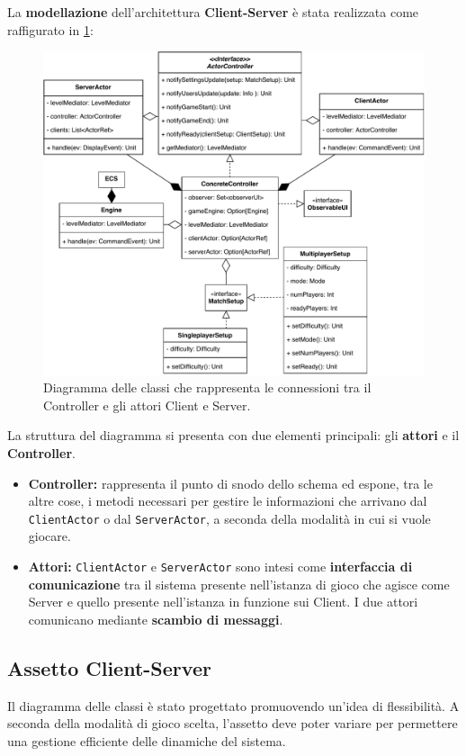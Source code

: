 La \textbf{modellazione} dell'architettura \textbf{Client-Server} è stata realizzata come raffigurato in \ref{fig:Controller-Actors-Interaction}:
\begin{figure}[H]
	\centering
	\includegraphics[width=0.99\columnwidth]{drawio/client-server/Controller-Actors-Interaction.pdf}
	\caption{Diagramma delle classi che rappresenta le connessioni tra il Controller e gli attori Client e Server.}
	\label{fig:Controller-Actors-Interaction}
\end{figure}
La struttura del diagramma si presenta con due elementi principali: gli \textbf{attori} e il \textbf{Controller}.
\begin{itemize}
    \item \textbf{Controller:} rappresenta il punto di snodo dello schema ed espone, tra le altre cose, i metodi necessari per gestire le informazioni che arrivano dal \texttt{ClientActor} o dal \texttt{ServerActor}, a seconda della modalità in cui si vuole giocare.
    \item \textbf{Attori:} \texttt{ClientActor} e \texttt{ServerActor} sono intesi come \textbf{interfaccia di comunicazione} tra il sistema presente nell'istanza di gioco che agisce come Server e quello presente nell'istanza in funzione sui Client. I due attori comunicano mediante \textbf{scambio di messaggi}.
\end{itemize}

\subsection{Assetto Client-Server} 
Il diagramma delle classi è stato progettato promuovendo un'idea di flessibilità. A seconda della modalità di gioco scelta, l'assetto deve poter variare per permettere una gestione efficiente delle dinamiche del sistema.
